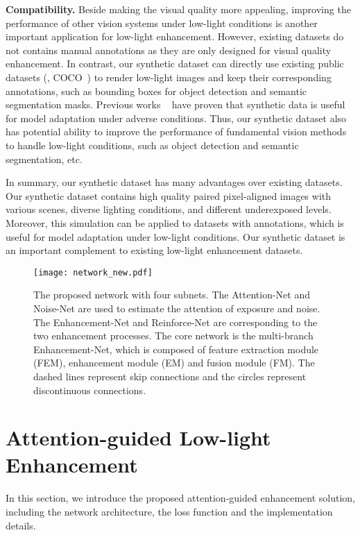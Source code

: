 {\bf Compatibility.} Beside making the visual quality more appealing, improving the performance of other vision systems under low-light conditions is another important application for low-light enhancement. However, existing datasets do not contains manual annotations as they are only designed for visual quality enhancement. In contrast, our synthetic dataset can directly use existing public datasets (\eg, COCO~\cite{lin2014microsoft}) to render low-light images and keep their corresponding annotations, such as bounding boxes for object detection and semantic segmentation masks. Previous works ~\cite{SynRealDataFog19,SynRealDataFogECCV18} have proven that synthetic data is useful for model adaptation under adverse conditions. Thus, our synthetic dataset also has potential ability to improve the performance of fundamental vision methods to handle low-light conditions, such as object detection and semantic segmentation, etc.

In summary, our synthetic dataset has many advantages over existing datasets. Our synthetic dataset contains high quality paired pixel-aligned images with various scenes, diverse lighting conditions, and different underexposed levels. Moreover, this simulation can be applied to datasets with annotations, which is useful for model adaptation under low-light conditions. Our synthetic dataset is an important complement to existing low-light enhancement datasets.

\begin{figure*}[t]
	\begin{center}
		\texttt{[image: network\_new.pdf]}
	\end{center}
	\caption{The proposed network with four subnets. The Attention-Net and Noise-Net are used to estimate the attention of exposure and noise. The Enhancement-Net and Reinforce-Net are corresponding to the two enhancement processes. The core network is the multi-branch Enhancement-Net, which is composed of feature extraction module (FEM), enhancement module (EM) and fusion module (FM). The dashed lines represent skip connections and the circles represent discontinuous connections.}
	\label{fig_MELLEN}
\end{figure*}

\section{Attention-guided Low-light Enhancement}
In this section, we introduce the proposed attention-guided enhancement solution, including the network architecture, the loss function and the implementation details.

